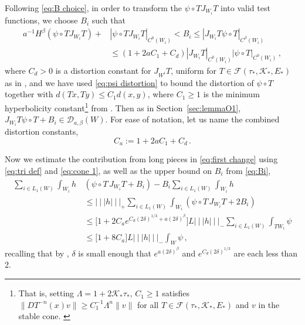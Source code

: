 \documentclass{amsart}
\numberwithin{equation}{section}
\newcommand\cD{{\mathcal D}}
\newcommand\cF{{\mathcal F}}
\newcommand\cK{{\mathcal K}}
\newcommand{\tri}{{|\:\!\!|\:\!\!|}}
\begin{document}
Following \eqref{eq:B choice}, in order to transform the $\psi \circ T J_{W_i}T$ into valid test functions, we choose $B_i$ such that
\begin{equation}
\label{eq:Bi}
\begin{split}
a^{-1} H^\beta(\psi \circ T J_{W_i}T) +& |\psi \circ T  J_{W_i}T |_{C^0(W_i)}  < B_i 
 \le |J_{W_i}T \psi \circ T|_{C^\beta(W_i)} \\
& \le (1+2aC_1 +C_d) |J_{W_i}T|_{C^0(W_i)} |\psi \circ T|_{C^0(W_i)} \, ,
\end{split}
\end{equation}
where $C_d > 0$ is a distortion constant for $J_{W^i}T$, uniform for $T \in \cF(\tau_*, \cK_*, E_*)$
as in \cite[eq. (3.5)]{DL22}, and we have used \eqref{eq:psi distortion} to bound the distortion of $\psi \circ T$
together with $d(Tx, Ty) \le C_1 d(x,y)$, where $C_1 \ge 1$ is the minimum hyperbolicity 
constant\footnote{That is, setting $\Lambda = 1 + 2 \cK_* \tau_*$, 
$C_1 \ge 1$ satisfies $\| DT^{-n}(x) v \| \ge C_1^{-1} \Lambda^n \| v\|$ for
all $T \in \cF(\tau_*, \cK_*, E_*)$ and $v$ in the stable cone. \label{foot:C1}}
from \cite[eq. (3.1)]{DL22}.
Then as in Section~\ref{sec:lemmaO1}, $J_{W_i}T \psi \circ T + B_i \in \cD_{a, \beta}(W)$.
For ease of notation, let us name the combined distortion constants,
\[
C_a := 1 + 2aC_1 + C_d \, .
\]

Now we estimate the contribution from long pieces in \eqref{eq:first change} using \eqref{eq:tri def} and \eqref{eq:cone 1}, as well as the upper bound on $B_i$ from \eqref{eq:Bi},
\begin{equation}
\label{eq:long first}
\begin{split}
\sum_{i \in L_1(W)} \int_{W_i} h \,& (\psi \circ T \, J_{W_i}T  + B_i) - B_i \sum_{i \in L_1(W)} \int_{W_i} h 
\\
& \le \tri h \tri_+ \sum_{i \in L_1(W)} \int_{W_i}  (\psi \circ T \, J_{W_i} T + 2B_i) \\
& \le \big[ 1+2C_a e^{C_d (2\delta)^{1/3} +a (2\delta)^\beta} \big] L \tri h \tri_-  \sum_{i \in L_1(W)} \int_{TW_i} \psi\\
&  \le \big[ 1 + 8C_a \big] L \tri h \tri_- \int_W \psi \, ,
\end{split}
\end{equation}
recalling that by \cite[Sect.~5.3]{DL22}, $\delta$ is small enough that 
$e^{a(2\delta)^\beta}$ and $e^{C_d (2\delta)^{1/3}}$ are each less than 2.
\end{document}
